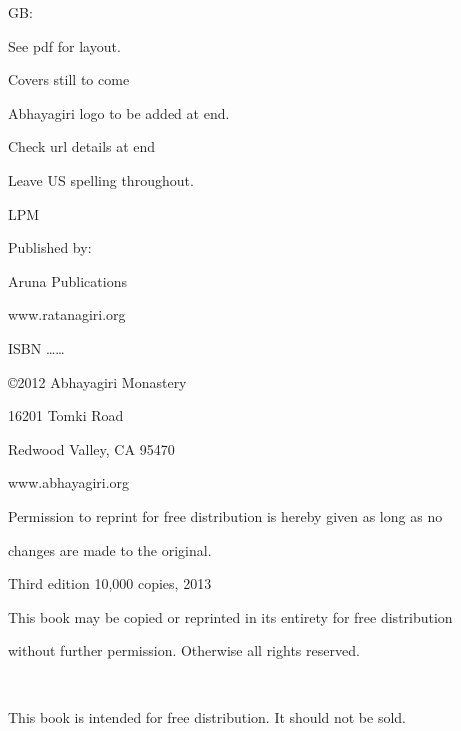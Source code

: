 \documentclass[a4paper,portrait,12pt]{article}
\begin{document}
\setlength{\oddsidemargin}{3.175cm-1in}
\setlength{\textwidth}{\paperwidth - 3.175cm-3.175cm}

GB:


See pdf for layout.


Covers still to come


Abhayagiri logo to be added at end.


Check url details at end


Leave US spelling throughout.





LPM

















Published by: 


Aruna Publications


www.ratanagiri.org 


ISBN \ldots{}\ldots{}





©2012 Abhayagiri Monastery  


16201 Tomki Road 


Redwood Valley, CA 95470 


www.abhayagiri.org 


 


Permission to reprint for free distribution is hereby given as long as no 


changes are made to the original. 


 


Third edition 10,000 copies, 2013








This book may be copied or reprinted in its entirety for free distribution


without further permission. Otherwise all rights reserved.


\begin{center}
 
\end{center}


This book is intended for free distribution. It should not be sold.
\end{document}
